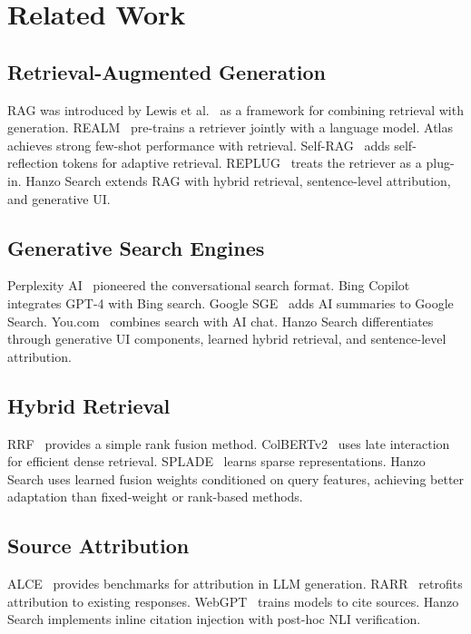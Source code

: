 \section{Related Work}

\label{sec:related}

\subsection{Retrieval-Augmented Generation}

RAG was introduced by Lewis et al.~\cite{lewis2020retrieval} as a framework for combining retrieval with generation. REALM~\cite{guu2020realm} pre-trains a retriever jointly with a language model. Atlas~\cite{izacard2023atlas} achieves strong few-shot performance with retrieval. Self-RAG~\cite{asai2023self} adds self-reflection tokens for adaptive retrieval. REPLUG~\cite{shi2023replug} treats the retriever as a plug-in. Hanzo Search extends RAG with hybrid retrieval, sentence-level attribution, and generative UI.

\subsection{Generative Search Engines}

Perplexity AI~\cite{perplexity2023} pioneered the conversational search format. Bing Copilot~\cite{nair2023bing} integrates GPT-4 with Bing search. Google SGE~\cite{google2023sge} adds AI summaries to Google Search. You.com~\cite{you2023} combines search with AI chat. Hanzo Search differentiates through generative UI components, learned hybrid retrieval, and sentence-level attribution.

\subsection{Hybrid Retrieval}

RRF~\cite{cormack2009reciprocal} provides a simple rank fusion method. ColBERTv2~\cite{santhanam2022colbertv2} uses late interaction for efficient dense retrieval. SPLADE~\cite{formal2022splade} learns sparse representations. Hanzo Search uses learned fusion weights conditioned on query features, achieving better adaptation than fixed-weight or rank-based methods.

\subsection{Source Attribution}

ALCE~\cite{gao2023alce} provides benchmarks for attribution in LLM generation. RARR~\cite{gao2023rarr} retrofits attribution to existing responses. WebGPT~\cite{nakano2021webgpt} trains models to cite sources. Hanzo Search implements inline citation injection with post-hoc NLI verification.

